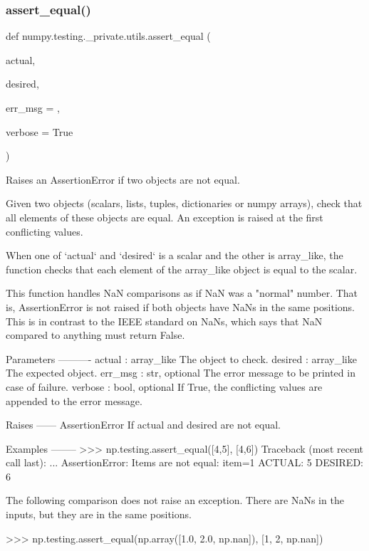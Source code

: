 \subsubsection{\texorpdfstring{assert\+\_\+equal()}{assert\_equal()}}
{\footnotesize\ttfamily def numpy.\+testing.\+\_\+private.\+utils.\+assert\+\_\+equal (\begin{DoxyParamCaption}\item[{}]{actual,  }\item[{}]{desired,  }\item[{}]{err\+\_\+msg = {\ttfamily \textquotesingle{}\textquotesingle{}},  }\item[{}]{verbose = {\ttfamily True} }\end{DoxyParamCaption})}

\begin{DoxyVerb}Raises an AssertionError if two objects are not equal.

Given two objects (scalars, lists, tuples, dictionaries or numpy arrays),
check that all elements of these objects are equal. An exception is raised
at the first conflicting values.

When one of `actual` and `desired` is a scalar and the other is array_like,
the function checks that each element of the array_like object is equal to
the scalar.

This function handles NaN comparisons as if NaN was a "normal" number.
That is, AssertionError is not raised if both objects have NaNs in the same
positions.  This is in contrast to the IEEE standard on NaNs, which says
that NaN compared to anything must return False.

Parameters
----------
actual : array_like
    The object to check.
desired : array_like
    The expected object.
err_msg : str, optional
    The error message to be printed in case of failure.
verbose : bool, optional
    If True, the conflicting values are appended to the error message.

Raises
------
AssertionError
    If actual and desired are not equal.

Examples
--------
>>> np.testing.assert_equal([4,5], [4,6])
Traceback (most recent call last):
    ...
AssertionError:
Items are not equal:
item=1
 ACTUAL: 5
 DESIRED: 6

The following comparison does not raise an exception.  There are NaNs
in the inputs, but they are in the same positions.

>>> np.testing.assert_equal(np.array([1.0, 2.0, np.nan]), [1, 2, np.nan])\end{DoxyVerb}
 \mbox{\label{namespacenumpy_1_1testing_1_1__private_1_1utils_aeb0834f11062ae32be7e366a8601278f}} 
